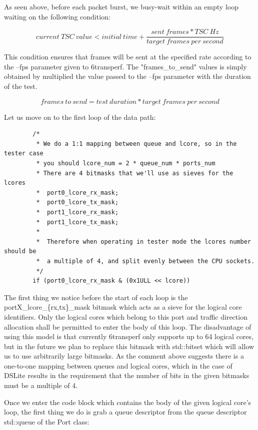 \documentclass[a4paper,12p]{article}
\begin{document}
As seen above, before each packet burst, we busy-wait within an empty loop waiting on the following condition:

\begin{equation}
current\ TSC\ value < initial\ time + \frac{sent\ frames * TSC\ Hz}{target\ frames\ per\ second}
\end{equation}

This condition ensures that frames will be sent at the specified rate according to the --fps parameter given to 6transperf. The "frames\_to\_send" values is simply obtained by multiplied the value passed to the –fps parameter with the duration of the test.

\begin{equation}
frames\ to\ send = test\ duration * target\ frames\ per\ second
\end{equation}

Let us move on to the first loop of the data path:
\begin{lstlisting}
        /*
         * We do a 1:1 mapping between queue and lcore, so in the tester case
         * you should lcore_num = 2 * queue_num * ports_num
         * There are 4 bitmasks that we'll use as sieves for the lcores
         *  port0_lcore_rx_mask;
         *  port0_lcore_tx_mask;
         *  port1_lcore_rx_mask;
         *  port1_lcore_tx_mask;
         *
         *  Therefore when operating in tester mode the lcores number should be
         *  a multiple of 4, and split evenly between the CPU sockets.
         */
        if (port0_lcore_rx_mask & (0x1ULL << lcore))
\end{lstlisting}

The first thing we notice before the start of each loop is the portX\_lcore\_\{rx,tx\}\_mask bitmask which acts as a sieve for the logical core identifiers. Only the logical cores which belong to this port and traffic direction allocation shall be permitted to enter the body of this loop. The disadvantage of using this model is that currently 6transperf only supports up to 64 logical cores, but in the future we plan to replace this bitmask with std::bitset which will allow us to use arbitrarily large bitmasks. As the comment above suggests there is a one-to-one mapping between queues and logical cores, which in the case of DSLite results in the requirement that the number of bits in the given bitmasks must be a multiple of 4.

Once we enter the code block which contains the body of the given logical core’s loop, the first thing we do is grab a queue descriptor from the queue descriptor std::queue of the Port class:
\end{document}
